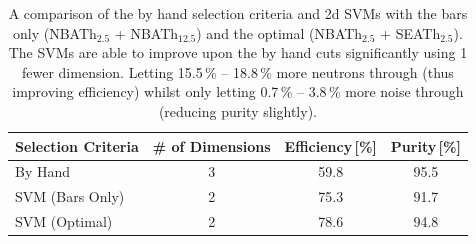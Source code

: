 \begin{table}[!h]
\centering
\begin{tabular}{lccc}  
\toprule
Selection Criteria & \# of Dimensions & Efficiency\,[\%] & Purity\,[\%] \\
\midrule
By Hand            & 3                & 59.8             & 95.5         \\
SVM (Bars Only)    & 2                & 75.3             & 91.7         \\
SVM (Optimal)      & 2                & 78.6             & 94.8         \\
\bottomrule  
\end{tabular}
\caption{A comparison of the by hand selection criteria and 2d SVMs with the bars only (NBATh$_{2.5}$ + NBATh$_{12.5}$) and the optimal (NBATh$_{2.5}$ + SEATh$_{2.5}$). The SVMs are able to improve upon the by hand cuts significantly using 1 fewer dimension. Letting 15.5\,\% -- 18.8\,\% more neutrons through (thus improving efficiency) whilst only letting 0.7\,\% -- 3.8\,\% more noise through (reducing purity slightly).}
\label{tab:svmSelection}
\end{table}

